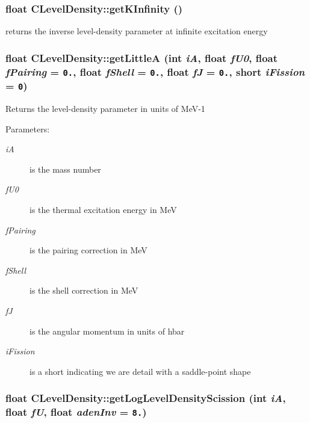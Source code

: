 \subsubsection{\setlength{\rightskip}{0pt plus 5cm}float CLevel\-Density::get\-KInfinity ()\hspace{0.3cm}{\tt  [static]}}\label{classCLevelDensity_f27496e4e8611b3509a7e70efa33508b}


returns the inverse level-density parameter at infinite excitation energy 
\subsubsection{\setlength{\rightskip}{0pt plus 5cm}float CLevel\-Density::get\-Little\-A (int {\em i\-A}, float {\em f\-U0}, float {\em f\-Pairing} = {\tt 0.}, float {\em f\-Shell} = {\tt 0.}, float {\em f\-J} = {\tt 0.}, short {\em i\-Fission} = {\tt 0})}\label{classCLevelDensity_58fc95dcb009f6594ccc069026c03e9c}


Returns the level-density parameter in units of Me\-V-1 \begin{Desc}
\item[Parameters:]
\begin{description}
\item[{\em i\-A}]is the mass number \item[{\em f\-U0}]is the thermal excitation energy in Me\-V \item[{\em f\-Pairing}]is the pairing correction in Me\-V \item[{\em f\-Shell}]is the shell correction in Me\-V \item[{\em f\-J}]is the angular momentum in units of hbar \item[{\em i\-Fission}]is a short indicating we are detail with a saddle-point shape \end{description}
\end{Desc}
\subsubsection{\setlength{\rightskip}{0pt plus 5cm}float CLevel\-Density::get\-Log\-Level\-Density\-Scission (int {\em i\-A}, float {\em f\-U}, float {\em aden\-Inv} = {\tt 8.})}\label{classCLevelDensity_ad13f8bf607fc24ad3b1f3b6258a507b}


